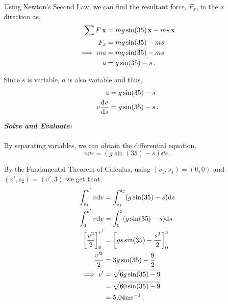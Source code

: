 \begin{subquestions}
Using Newton's Second Law, we can find the resultant force, $F_x$, in the $x$ direction as,
\begin{align}
	\sum F \,\mathbf{x} & = mg\sin(35)\,\mathbf{x} - ms\,\mathbf{x} \nonumber \\
	    F_x & = mg\sin(35) - ms \nonumber \\
	    \implies ma & = mg\sin(35) - ms \nonumber \\
	    a & = g\sin(35) - s \,.
\end{align}

Since $s$ is variable, $a$ is also variable and thus,
\begin{align}
	a & = g\sin(35) - s \nonumber \\
	v\frac{\mathrm{d}v}{\mathrm{d}s} & = g\sin(35) - s \,.
\end{align}




\textbf{\textit{Solve and Evaluate:}} \\ \\
By separating variables, we can obtain the differential equation,
\begin{equation}
	v\dd v = (g\sin(35) - s) \dd s \,.
\end{equation}

By the Fundamental Theorem of Calculus, using $(v_1,s_1)=(0,0)$ and $(v',s_2)=(v',3)$ we get that,
\begin{align}
	\int_{v_1}^{v'}v \mathrm{d} v & = \int_{s_1}^{s_2} (g\sin(35) - s) \mathrm{d} s \nonumber \\
	\int_{0}^{v'}v \mathrm{d} v & = \int_{0}^{3} (g\sin(35) - s) \mathrm{d} s \nonumber \\
	\left[\frac{v^2}{2}\right]^{v'}_0 & = \left[gs\sin(35)-\frac{s^2}{2} \right]^3_0 \nonumber \\
	 \frac{v'^2}{2} & = 3g\sin(35) - \frac{9}{2} \nonumber \\
	\implies v'& = \sqrt{6g\sin(35)-9} \nonumber \\
	           & =  \sqrt{60\sin(35)-9} \nonumber \\
	           & = 5.04 \text{ms}^{-1} \,.	           
\end{align}

\end{subquestions}